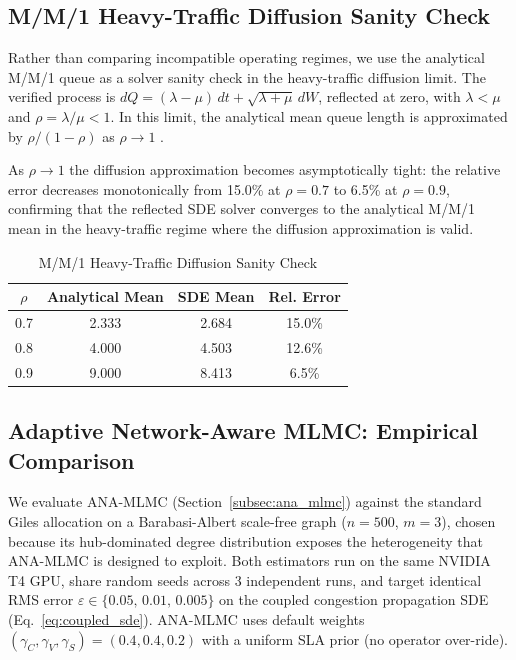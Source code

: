 \documentclass[pdflatex,sn-mathphys-num]{sn-jnl}
\theoremstyle{thmstyleone}%
\theoremstyle{thmstyletwo}%
\theoremstyle{thmstylethree}%
\newcommand{\mmonererr}{6.5}
\newcommand{\mmonererrA}{15.0}
\newcommand{\mmonererrB}{12.6}
\newcommand{\mmonererrC}{6.5}
\begin{document}
\subsection{M/M/1 Heavy-Traffic Diffusion Sanity Check}
\label{subsec:analytical}

Rather than comparing incompatible operating regimes, we use the analytical M/M/1 queue as a
solver sanity check in the heavy-traffic diffusion limit. The verified process is
$dQ = (\lambda-\mu)\,dt + \sqrt{\lambda+\mu}\,dW$, reflected at zero, with $\lambda < \mu$ and
$\rho=\lambda/\mu<1$. In this limit, the analytical mean queue length is approximated by
$\rho/(1-\rho)$ as $\rho \to 1$ \cite{whitt2002,harrison1985,kang2007}.

As $\rho\!\to\!1$ the diffusion approximation becomes asymptotically tight: the relative error
decreases monotonically from \mmonererrA\% at $\rho=0.7$ to \mmonererr\% at $\rho=0.9$,
confirming that the reflected SDE solver converges to the analytical M/M/1 mean in the
heavy-traffic regime where the diffusion approximation is valid.

\begin{table}[!t]
\caption{M/M/1 Heavy-Traffic Diffusion Sanity Check}
\label{tab:mm1_sanity}
\centering
\begin{tabular}{@{}c c c c@{}}
\toprule
$\rho$ & Analytical Mean & SDE Mean & Rel. Error \\
\midrule
0.7 & 2.333 & 2.684 & \mmonererrA\% \\
0.8 & 4.000 & 4.503 & \mmonererrB\% \\
0.9 & 9.000 & 8.413 & \mmonererrC\% \\
\bottomrule
\end{tabular}
\end{table}

\subsection{Adaptive Network-Aware MLMC: Empirical Comparison}
\label{subsec:ana_results}

We evaluate ANA-MLMC (Section~\ref{subsec:ana_mlmc}) against the standard Giles allocation on a
Barabasi-Albert scale-free graph ($n=500$, $m=3$), chosen because its hub-dominated degree
distribution exposes the heterogeneity that ANA-MLMC is designed to exploit. Both estimators run
on the same NVIDIA T4 GPU, share random seeds across 3 independent runs, and target identical RMS
error $\varepsilon \in \{0.05,\,0.01,\,0.005\}$ on the coupled congestion propagation SDE
(Eq.~\eqref{eq:coupled_sde}). ANA-MLMC uses default weights
$(\gamma_C,\gamma_V,\gamma_S)=(0.4,0.4,0.2)$ with a uniform SLA prior (no operator over-ride).
\end{document}
